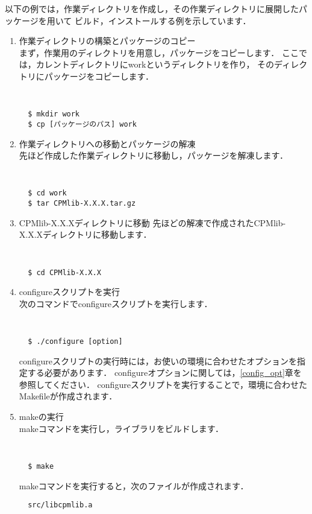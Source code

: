 以下の例では，作業ディレクトリを作成し，その作業ディレクトリに展開したパッケージを用いて
ビルド，インストールする例を示しています．

\begin{enumerate}
\item 作業ディレクトリの構築とパッケージのコピー\\
まず，作業用のディレクトリを用意し，パッケージをコピーします．
ここでは，カレントディレクトリにworkというディレクトリを作り，
そのディレクトリにパッケージをコピーします．
{\tt
\begin{verbatim}
  $ mkdir work
  $ cp [パッケージのパス] work
\end{verbatim}
}


\item 作業ディレクトリへの移動とパッケージの解凍\\
先ほど作成した作業ディレクトリに移動し，パッケージを解凍します．
{\tt
\begin{verbatim}
  $ cd work
  $ tar CPMlib-X.X.X.tar.gz
\end{verbatim}
}

\item CPMlib-X.X.Xディレクトリに移動
先ほどの解凍で作成されたCPMlib-X.X.Xディレクトリに移動します．
{\tt
\begin{verbatim}
  $ cd CPMlib-X.X.X
\end{verbatim}
}


\item configureスクリプトを実行\\
次のコマンドでconfigureスクリプトを実行します．
{\tt
\begin{verbatim}
  $ ./configure [option]
\end{verbatim}
}
\noindent
configureスクリプトの実行時には，お使いの環境に合わせたオプションを指定する必要があります．
configureオプションに関しては，\ref{config_opt}章を参照してください．
configureスクリプトを実行することで，環境に合わせたMakefileが作成されます．\\

\item makeの実行\\
makeコマンドを実行し，ライブラリをビルドします．
{\tt
\begin{verbatim}
  $ make
\end{verbatim}
}

makeコマンドを実行すると，次のファイルが作成されます．
\begin{verbatim}
  src/libcpmlib.a
\end{verbatim}


\end{enumerate}
